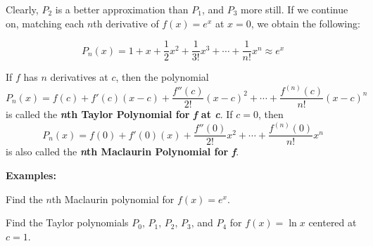 Clearly, $P_2$ is a better approximation than $P_1$, and $P_3$ more still. If we continue on, matching each $n$th derivative of $f(x)=e^x$ at $x=0$, we obtain the following:

\[P_n(x)=1+x+\frac{1}{2}x^2+\frac{1}{3!}x^3+\cdots+\frac{1}{n!}x^n\approx e^x\]

\vspace{.1in}

\begin{tcolorbox}[title= DEFINITIONS OF THE \textit{\textbf{n}}TH TAYLOR POLYNOMIAL AND \textbf{\textit{n}}TH MACLAURIN POLYNOMIAL,colframe=black,sharp corners,colback=white,colbacktitle=white,coltitle=black]

    If $f$ has $n$ derivatives at $c$, then the polynomial
    \[P_n(x)=f(c)+f'(c)(x-c)+\frac{f''(c)}{2!}(x-c)^2+\cdots+\frac{f^{(n)}(c)}{n!}(x-c)^n\]
    is called the \textbf{\textit{n}th Taylor Polynomial for \textit{f} at \textit{c}}. If $c=0$, then
    \[P_n(x)=f(0)+f'(0)(x)+\frac{f''(0)}{2!}x^2+\cdots+\frac{f^{(n)}(0)}{n!}x^n\]
    is also called the \textbf{\textit{n}th Maclaurin Polynomial for \textit{f}}. 

\end{tcolorbox}

\newpage

\noindent\textbf{Examples:}
\begin{questions}
    \question Find the $n$th Maclaurin polynomial for $f(x)=e^x$.
    
    \question Find the Taylor polynomials $P_0,\,P_1,\,P_2,\,P_3,\,$and $P_4$ for $f(x)=\ln x$ centered at $c=1$.
\end{questions}

